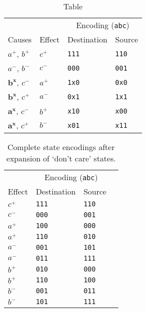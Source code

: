 \begin{table}[ht]
\caption{Table}\label{tab:enc}
\centering
\begin{tabular}{@{}llll@{}}
	\toprule
	& & \multicolumn{2}{c}{Encoding (\texttt{abc})}\\ \cmidrule(l){3-4}
	Causes & Effect & Destination & Source\\ \midrule
	$a^{+}$, $b^{+}$		& $c^{+}$ & \texttt{111} & \texttt{110}\\
	$a^{-}$, $b^{-}$ 		& $c^{-}$ & \texttt{000} & \texttt{001}\\
	$\mathbf{b^{x}}$, $c^{-}$	& $a^{+}$ & \texttt{1x0} & \texttt{0x0}\\
	$\mathbf{b^{x}}$, $c^{+}$	& $a^{-}$ & \texttt{0x1} & \texttt{1x1}\\
	$\mathbf{a^{x}}$, $c^{-}$	& $b^{+}$ & \texttt{x10} & \texttt{x00}\\
	$\mathbf{a^{x}}$, $c^{+}$	& $b^{-}$ & \texttt{x01} & \texttt{x11}\\
	\bottomrule
\end{tabular}
\end{table}

\begin{table}[ht]
\caption{Complete state encodings after expansion of `don't care' states.}\label{tab:enc_complete}
\centering
\begin{tabular}{@{}llll@{}}
	\toprule
	& \multicolumn{2}{c}{Encoding (\texttt{abc})}\\ \cmidrule(l){2-3}
	Effect & Destination & Source\\ \midrule
	$c^{+}$ & \texttt{111} & \texttt{110}\\[0.25em]
	$c^{-}$ & \texttt{000} & \texttt{001}\\[0.25em]
	$a^{+}$ & \texttt{100} & \texttt{000}\\
	$a^{+}$ & \texttt{110} & \texttt{010}\\[0.25em]
	$a^{-}$ & \texttt{001} & \texttt{101}\\
	$a^{-}$ & \texttt{011} & \texttt{111}\\[0.25em]
	$b^{+}$ & \texttt{010} & \texttt{000}\\
	$b^{+}$ & \texttt{110} & \texttt{100}\\[0.25em]
	$b^{-}$ & \texttt{001} & \texttt{011}\\
	$b^{-}$ & \texttt{101} & \texttt{111}\\
	\bottomrule
\end{tabular}
\end{table}

